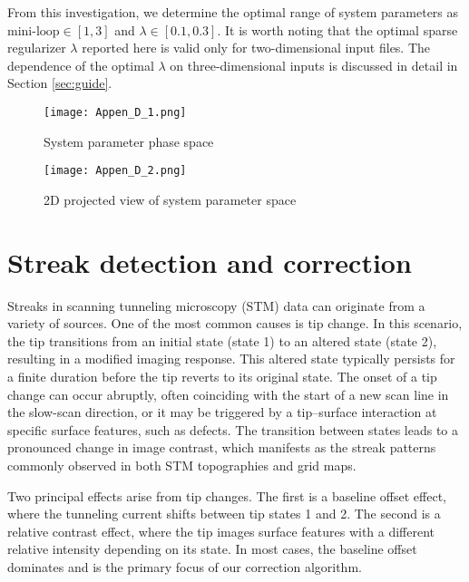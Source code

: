 From this investigation, we determine the optimal range of system parameters as $\text{mini-loop} \in [1, 3]$ and $\lambda \in [0.1, 0.3]$. It is worth noting that the optimal sparse regularizer $\lambda$ reported here is valid only for two-dimensional input files. The dependence of the optimal $\lambda$ on three-dimensional inputs is discussed in detail in Section \ref{sec:guide}.  

\begin{figure}
	\texttt{[image: Appen\_D\_1.png]}
	\centering
	\caption{System parameter phase space}
	\label{fig:system_param}
\end{figure}

\begin{figure}
	\centering
	\texttt{[image: Appen\_D\_2.png]}
	\caption{2D projected view of system parameter space}
	\label{fig:proj_system_param}
\end{figure}

\chapter{Streak detection and correction}\label{appen:streak_detection}
Streaks in scanning tunneling microscopy (STM) data can originate from a variety of sources. One of the most common causes is tip change. In this scenario, the tip transitions from an initial state (state 1) to an altered state (state 2), resulting in a modified imaging response. This altered state typically persists for a finite duration before the tip reverts to its original state. The onset of a tip change can occur abruptly, often coinciding with the start of a new scan line in the slow-scan direction, or it may be triggered by a tip–surface interaction at specific surface features, such as defects. The transition between states leads to a pronounced change in image contrast, which manifests as the streak patterns commonly observed in both \ac{STM} topographies and grid maps.

Two principal effects arise from tip changes. The first is a baseline offset effect, where the tunneling current shifts between tip states 1 and 2. The second is a relative contrast effect, where the tip images surface features with a different relative intensity depending on its state. In most cases, the baseline offset dominates and is the primary focus of our correction algorithm.

